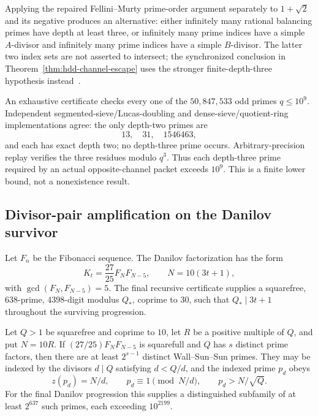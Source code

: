 Applying the repaired Fellini--Murty prime-order argument separately to
$1+\sqrt2$ and its negative produces an alternative: either infinitely many
rational balancing primes have depth at least three, or infinitely many
prime indices have a simple $A$-divisor and infinitely many prime indices
have a simple $B$-divisor.  The latter two index sets are not asserted to
intersect; the synchronized conclusion in
Theorem~\ref{thm:hdd-channel-escape} uses the stronger finite-depth-three
hypothesis instead~\cite{FelliniMurty2026}.

An exhaustive certificate checks every one of the $50{,}847{,}533$ odd
primes $q\leq10^9$.  Independent segmented-sieve/Lucas-doubling and
dense-sieve/quotient-ring implementations agree: the only depth-two primes
are
\[
                         13,\quad31,\quad1546463,
\]
and each has exact depth two; no depth-three prime occurs.  Arbitrary-precision
replay verifies the three residues modulo $q^3$.  Thus each depth-three prime
required by an actual opposite-channel packet exceeds $10^9$.  This is a
finite lower bound, not a nonexistence result.

\subsection{Divisor-pair amplification on the Danilov survivor}

Let $F_n$ be the Fibonacci sequence.  The Danilov factorization has the
form
\[
                    K_t=\frac{27}{25}F_NF_{N-5},
              \qquad N=10(3t+1),
\]
with $\gcd(F_N,F_{N-5})=5$.  The final recursive certificate supplies a
squarefree, $638$-prime, $4398$-digit modulus $Q_*$, coprime to $30$, such
that $Q_*\mid3t+1$ throughout the surviving progression.

\begin{theorem}
\label{thm:hdd-wss-amplification}
Let $Q>1$ be squarefree and coprime to $10$, let $R$ be a positive multiple
of $Q$, and put $N=10R$.
If $(27/25)F_NF_{N-5}$ is squarefull and $Q$ has $s$ distinct prime factors,
then there are at least $2^{s-1}$ distinct Wall--Sun--Sun primes.  They may
be indexed by the divisors $d\mid Q$ satisfying $d<Q/d$, and the indexed
prime $p_d$ obeys
\[
                z(p_d)=N/d,\qquad p_d\equiv1\pmod{N/d},
                \qquad p_d>N/\sqrt Q.
\]
For the final Danilov progression this supplies a distinguished subfamily of
at least $2^{637}$ such primes, each exceeding $10^{2199}$.
\end{theorem}

